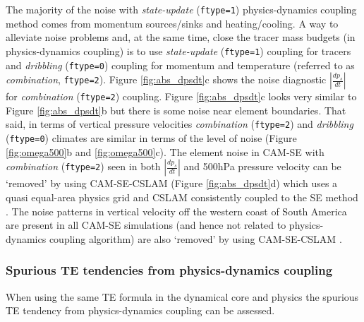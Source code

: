 \documentclass[draft,linenumbers]{agujournal}
\begin{document}
The majority of the noise with {\em{state-update}} ({\tt{ftype=1}}) physics-dynamics coupling method comes from momentum sources/sinks and heating/cooling. A way to alleviate noise problems and, at the same time, close the tracer mass budgets (in physics-dynamics coupling) is to use {\em{state-update}} ({\tt{ftype=1}}) coupling for tracers and {\em{dribbling}} ({\tt{ftype=0}}) coupling for momentum and temperature (referred to as {\em{combination}}, {\tt{ftype=2}}). Figure \ref{fig:abs_dpsdt}c shows the noise diagnostic $|\frac{dp_s}{dt}|$ for {\em{combination}} ({\tt{ftype=2}}) coupling. Figure \ref{fig:abs_dpsdt}c looks very similar to Figure \ref{fig:abs_dpsdt}b but there is some noise near element boundaries. That said, in terms of vertical pressure velocities {\em{combination}} ({\tt{ftype=2}}) and {\em{dribbling}} ({\tt{ftype=0}}) climates are similar in terms of the level of noise (Figure \ref{fig:omega500}b and \ref{fig:omega500}c). The element noise in CAM-SE with {\em{combination}} ({\tt{ftype=2}}) seen in both $|\frac{dp_s}{dt}|$ and 500hPa pressure velocity can be `removed' by using CAM-SE-CSLAM (Figure \ref{fig:abs_dpsdt}d) which uses a quasi equal-area physics grid and CSLAM \cite[Conservative Semi-LAgrangian Multi-tracer; ][]{LNU2010JCP} consistently coupled to the SE method \citep{LTOUNGK2017MWR}. The noise patterns in vertical velocity off the western coast of South America are present in all CAM-SE simulations (and hence not related to physics-dynamics coupling algorithm) are also `removed' by using CAM-SE-CSLAM \citep{HetAl2018MWR}.
\subsubsection{Spurious TE tendencies from physics-dynamics coupling}
When using the same TE formula in the dynamical core and physics the spurious TE tendency from physics-dynamics coupling can be assessed. {}
\end{document}
